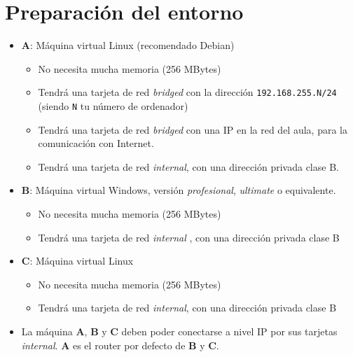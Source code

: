 \section{Preparación del entorno}
\begin{itemize}
\item  \textbf{A}: Máquina virtual Linux (recomendado Debian)
  \begin{itemize}
  \item No necesita mucha memoria (256 MBytes)
    
  \item Tendrá una tarjeta de red \textit{bridged} con la dirección \texttt{192.168.255.N/24} (siendo \texttt{N} tu número de ordenador)
  \item Tendrá una tarjeta de red \textit{bridged} con una IP en la red del aula, para la comunicación con Internet.
  \item Tendrá una tarjeta de red \textit{internal}, con una dirección privada clase B.

  \end{itemize}



\item \textbf{B}: Máquina virtual Windows, versión \textit{profesional}, \textit{ultimate} o equivalente.
  \begin{itemize}
  \item  No necesita mucha memoria (256 MBytes)
  \item Tendrá una tarjeta de red \textit{internal} , con una dirección privada clase B
  \end{itemize}
\item \textbf{C}: Máquina virtual Linux
  \begin{itemize}
  \item No necesita mucha memoria (256 MBytes)
  \item Tendrá una tarjeta de red \textit{internal}, con una dirección privada clase B
  \end{itemize}
  
\item  La máquina \textbf{A}, \textbf{B} y \textbf{C} deben poder conectarse a nivel IP por sus tarjetas \textit{internal}. \textbf{A} es el router por defecto de \textbf{B} y \textbf{C}.
\end{itemize}



